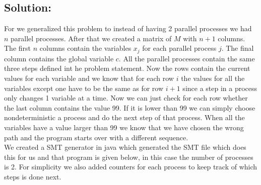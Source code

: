 \documentclass[12pt]{article}
\begin{document}
\subsection*{Solution:}
For we generalized this problem to instead of having 2 parallel processes we had $n$ parallel processes. After that we created a matrix of $M$ with $n+1$ columns. The first $n$ columns contain the variables $x_j$ for each parallel process $j$. The final column contains the global variable $c$. All the parallel processes contain the same three steps defined int he problem statement. Now the rows contain the current values for each variable and we know that for each row $i$ the values for all the variables except one have to be the same as for row $i+1$ since a step in a process only changes 1 variable at  a time. 
Now we can just check for each row whether the last column contains the value 99. If it is lower than 99 we can simply choose nondeterministic a process and do the next step of that process. When all the variables have a value larger than 99 we know that we have chosen the wrong path and the program starts over with a different sequence. \\
We created a SMT generator in java which generated the SMT file which does this for us and that program is given below, in this case the number of processes is 2. For simplicity we also added counters for each process to keep track of which steps is done next.
\end{document}
